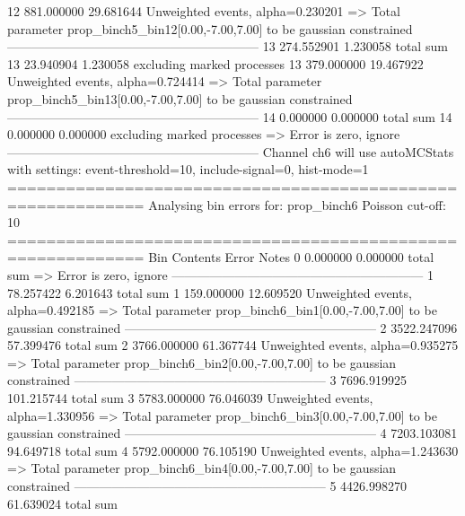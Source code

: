 12         881.000000      29.681644       Unweighted events, alpha=0.230201
  => Total parameter prop_binch5_bin12[0.00,-7.00,7.00] to be gaussian constrained
------------------------------------------------------------
13         274.552901      1.230058        total sum                     
13         23.940904       1.230058        excluding marked processes    
13         379.000000      19.467922       Unweighted events, alpha=0.724414
  => Total parameter prop_binch5_bin13[0.00,-7.00,7.00] to be gaussian constrained
------------------------------------------------------------
14         0.000000        0.000000        total sum                     
14         0.000000        0.000000        excluding marked processes    
  => Error is zero, ignore      
------------------------------------------------------------
Channel ch6 will use autoMCStats with settings: event-threshold=10, include-signal=0, hist-mode=1
============================================================
Analysing bin errors for: prop_binch6
Poisson cut-off: 10
============================================================
Bin        Contents        Error           Notes                         
0          0.000000        0.000000        total sum                     
  => Error is zero, ignore      
------------------------------------------------------------
1          78.257422       6.201643        total sum                     
1          159.000000      12.609520       Unweighted events, alpha=0.492185
  => Total parameter prop_binch6_bin1[0.00,-7.00,7.00] to be gaussian constrained
------------------------------------------------------------
2          3522.247096     57.399476       total sum                     
2          3766.000000     61.367744       Unweighted events, alpha=0.935275
  => Total parameter prop_binch6_bin2[0.00,-7.00,7.00] to be gaussian constrained
------------------------------------------------------------
3          7696.919925     101.215744      total sum                     
3          5783.000000     76.046039       Unweighted events, alpha=1.330956
  => Total parameter prop_binch6_bin3[0.00,-7.00,7.00] to be gaussian constrained
------------------------------------------------------------
4          7203.103081     94.649718       total sum                     
4          5792.000000     76.105190       Unweighted events, alpha=1.243630
  => Total parameter prop_binch6_bin4[0.00,-7.00,7.00] to be gaussian constrained
------------------------------------------------------------
5          4426.998270     61.639024       total sum                     
